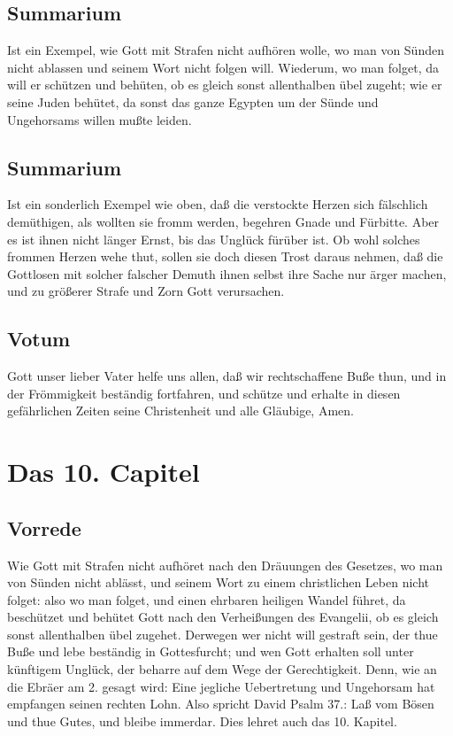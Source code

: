 \section{Summarium}

Ist ein Exempel, wie Gott mit Strafen nicht aufhören wolle, wo man von Sünden nicht ablassen und seinem Wort nicht folgen will. Wiederum, wo man folget, da will er schützen und behüten, ob es gleich sonst allenthalben übel zugeht; wie er seine Juden behütet, da sonst das ganze Egypten um der Sünde und Ungehorsams willen mußte leiden.

\section{Summarium}

Ist ein sonderlich Exempel wie oben, daß die verstockte Herzen sich fälschlich demüthigen, als wollten sie fromm werden, begehren Gnade und Fürbitte. Aber es ist ihnen nicht länger Ernst, bis das Unglück fürüber ist. Ob wohl solches frommen Herzen wehe thut, sollen sie doch diesen Trost daraus nehmen, daß die Gottlosen mit solcher falscher Demuth ihnen selbst ihre Sache nur ärger machen, und zu größerer Strafe und Zorn Gott verursachen.

\section{Votum}

Gott unser lieber Vater helfe uns allen, daß wir rechtschaffene Buße thun, und in der Frömmigkeit beständig fortfahren, und schütze und erhalte in diesen gefährlichen Zeiten seine Christenheit und alle Gläubige, Amen.

\chapter{Das 10. Capitel}

\section{Vorrede}

Wie Gott mit Strafen nicht aufhöret nach den Dräuungen des Gesetzes, wo man von Sünden nicht ablässt, und seinem Wort zu einem christlichen Leben nicht folget: also wo man folget, und einen ehrbaren heiligen Wandel führet, da beschützet und behütet Gott nach den Verheißungen des Evangelii, ob es gleich sonst allenthalben übel zugehet. Derwegen wer nicht will gestraft sein, der thue Buße und lebe beständig in Gottesfurcht; und wen Gott erhalten soll unter künftigem Unglück, der beharre auf dem Wege der Gerechtigkeit. Denn, wie an die Ebräer am 2. gesagt wird: Eine jegliche Uebertretung und Ungehorsam hat empfangen seinen rechten Lohn. Also spricht David Psalm 37.: Laß vom Bösen und thue Gutes, und bleibe immerdar. Dies lehret auch das 10. Kapitel.

